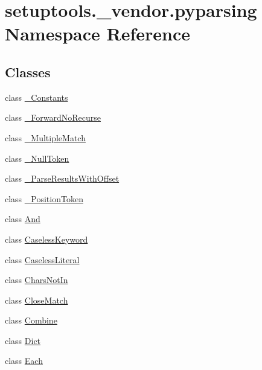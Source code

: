 \hypertarget{namespacesetuptools_1_1__vendor_1_1pyparsing}{}\section{setuptools.\+\_\+vendor.\+pyparsing Namespace Reference}
\label{namespacesetuptools_1_1__vendor_1_1pyparsing}
\subsection*{Classes}
\begin{DoxyCompactItemize}
\item 
class \hyperlink{classsetuptools_1_1__vendor_1_1pyparsing_1_1__Constants}{\+\_\+\+Constants}
\item 
class \hyperlink{classsetuptools_1_1__vendor_1_1pyparsing_1_1__ForwardNoRecurse}{\+\_\+\+Forward\+No\+Recurse}
\item 
class \hyperlink{classsetuptools_1_1__vendor_1_1pyparsing_1_1__MultipleMatch}{\+\_\+\+Multiple\+Match}
\item 
class \hyperlink{classsetuptools_1_1__vendor_1_1pyparsing_1_1__NullToken}{\+\_\+\+Null\+Token}
\item 
class \hyperlink{classsetuptools_1_1__vendor_1_1pyparsing_1_1__ParseResultsWithOffset}{\+\_\+\+Parse\+Results\+With\+Offset}
\item 
class \hyperlink{classsetuptools_1_1__vendor_1_1pyparsing_1_1__PositionToken}{\+\_\+\+Position\+Token}
\item 
class \hyperlink{classsetuptools_1_1__vendor_1_1pyparsing_1_1And}{And}
\item 
class \hyperlink{classsetuptools_1_1__vendor_1_1pyparsing_1_1CaselessKeyword}{Caseless\+Keyword}
\item 
class \hyperlink{classsetuptools_1_1__vendor_1_1pyparsing_1_1CaselessLiteral}{Caseless\+Literal}
\item 
class \hyperlink{classsetuptools_1_1__vendor_1_1pyparsing_1_1CharsNotIn}{Chars\+Not\+In}
\item 
class \hyperlink{classsetuptools_1_1__vendor_1_1pyparsing_1_1CloseMatch}{Close\+Match}
\item 
class \hyperlink{classsetuptools_1_1__vendor_1_1pyparsing_1_1Combine}{Combine}
\item 
class \hyperlink{classsetuptools_1_1__vendor_1_1pyparsing_1_1Dict}{Dict}
\item 
class \hyperlink{classsetuptools_1_1__vendor_1_1pyparsing_1_1Each}{Each}

\end{DoxyCompactItemize}
